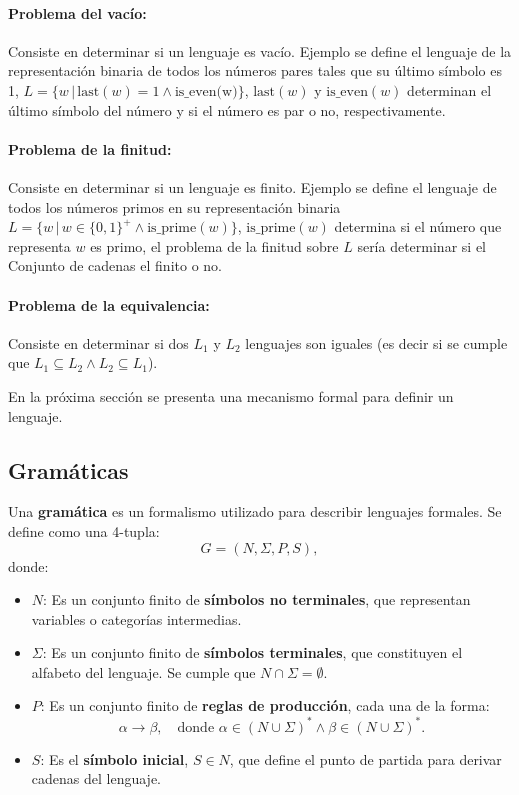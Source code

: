 \documentclass[12pt]{article}
\begin{document}
\paragraph{Problema del vacío:} Consiste en determinar si un lenguaje es vacío. Ejemplo se define el lenguaje de la
representación binaria de todos los números pares tales que su último símbolo es 1, $L=\{w\,|\,\text{last}(w)=1 \wedge \text{is\_even(w)}\}$, $\text{last}(w)$ y $\text{is\_even}(w)$
determinan el último símbolo del número y si el número es par o no, respectivamente.
\paragraph{Problema de la finitud:} Consiste en determinar si un lenguaje es finito. Ejemplo se define el lenguaje de todos los números primos en su representación binaria
$L=\{w\,|\,w\in \{0,1\}^+ \wedge \text{is\_prime}(w) \}$, $\text{is\_prime}(w)$ determina si el número que representa $w$ es primo, el problema de la finitud sobre $L$ sería 
determinar si el Conjunto de cadenas el finito o no.
\paragraph{Problema de la equivalencia:} Consiste en determinar si dos $L_1$ y $L_2$ lenguajes son iguales (es decir si se cumple que
$L_1\subseteq L_2 \wedge L_2\subseteq L_1$).

En la próxima sección se presenta una mecanismo formal para definir un lenguaje.

\subsection{Gramáticas}

Una \textbf{gramática} es un formalismo utilizado para describir lenguajes formales. Se define como una 4-tupla:
\[
      G = (N, \Sigma, P, S),
\]
donde:
\begin{itemize}
      \item \(N\): Es un conjunto finito de \textbf{símbolos no terminales}, que representan variables o categorías intermedias.
      \item \(\Sigma\): Es un conjunto finito de \textbf{símbolos terminales}, que constituyen el alfabeto del lenguaje. Se cumple que \(N \cap \Sigma = \emptyset\).
      \item \(P\): Es un conjunto finito de \textbf{reglas de producción}, cada una de la forma:
            \[
                  \alpha \to \beta, \quad \text{donde } \alpha \in (N \cup \Sigma)^* \wedge \beta \in (N \cup \Sigma)^*.
            \]
      \item \(S\): Es el \textbf{símbolo inicial}, \(S \in N\), que define el punto de partida para derivar cadenas del lenguaje.
\end{itemize}
\end{document}

